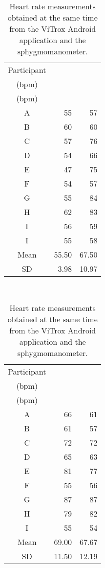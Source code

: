 \begin{table}[p]
  \begin{subtable}{0.5\textwidth}
    \centering
    \begin{tabular}{crr}
      \hline
        Participant & \multilinecell{Pulse\\(bpm)} & \multilinecell{Sphy.\\(bpm)} \\
      \hline
        A & 55 & 57 \\
        B & 60 & 60 \\
        C & 57 & 76 \\
        D & 54 & 66 \\
        E & 47 & 75 \\
        F & 54 & 57 \\
        G & 55 & 84 \\
        H & 62 & 83 \\
        I & 56 & 59 \\
        I & 55 & 58 \\
      \hline
        Mean & 55.50 & 67.50 \\
        SD   &  3.98 & 10.97 \\
      \hline
    \end{tabular}
    \caption{
      Heart rate measurements obtained at the same time from the implemented
      Android application, Pulse, and the sphygmomanometer.
    }
    \label{tab:heart:pulse:normal}
  \end{subtable}
  ~
  \begin{subtable}{0.5\textwidth}
    \centering
    \begin{tabular}{crr}
      \hline
        Participant & \multilinecell{ViTrox\\(bpm)} & \multilinecell{Sphy.\\(bpm)} \\
      \hline
        A & 66 & 61 \\
        B & 61 & 57 \\
        C & 72 & 72 \\
        D & 65 & 63 \\
        E & 81 & 77 \\
        F & 55 & 56 \\
        G & 87 & 87 \\
        H & 79 & 82 \\
        I & 55 & 54 \\
      \hline
        Mean & 69.00 & 67.67 \\
        SD   & 11.50 & 12.19 \\
      \hline
    \end{tabular}
    \caption{
      Heart rate measurements obtained at the same time from the ViTrox
      Android application and the sphygmomanometer.
    }
    \label{tab:heart:vitrox:normal}
  \end{subtable}


\end{table}
